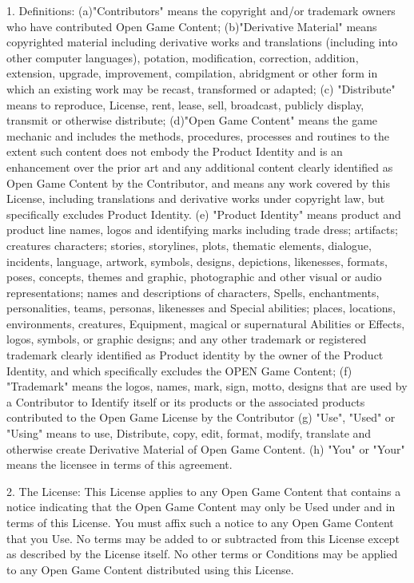 \documentclass[a4paper,11pt,twoside,openany]{book}
\begin{document}
{{1. Definitions: (a)"Contributors" means the copyright and/or trademark owners who have contributed Open Game Content; (b)"Derivative Material" means copyrighted material including derivative works and translations (including into other computer languages), potation, modification, correction, addition, extension, upgrade, improvement, compilation, abridgment or other form in which an existing work may be recast, transformed or adapted; (c) "Distribute" means to reproduce, License, rent, lease, sell, broadcast, publicly display, transmit or otherwise distribute; (d)"Open Game Content" means the game mechanic and includes the methods, procedures, processes and routines to the extent such content does not embody the Product Identity and is an enhancement over the prior art and any additional content clearly identified as Open Game Content by the Contributor, and means any work covered by this License, including translations and derivative works under copyright law, but specifically excludes Product Identity. (e) "Product Identity" means product and product line names, logos and identifying marks including trade dress; artifacts; creatures characters; stories, storylines, plots, thematic elements, dialogue, incidents, language, artwork, symbols, designs, depictions, likenesses, formats, poses, concepts, themes and graphic, photographic and other visual or audio representations; names and descriptions of characters, Spells, enchantments, personalities, teams, personas, likenesses and Special abilities; places, locations, environments, creatures, Equipment, magical or supernatural Abilities or Effects, logos, symbols, or graphic designs; and any other trademark or registered trademark clearly identified as Product identity by the owner of the Product Identity, and which specifically excludes the OPEN Game Content; (f) "Trademark" means the logos, names, mark, sign, motto, designs that are used by a Contributor to Identify itself or its products or the associated products contributed to the Open Game License by the Contributor (g) "Use", "Used" or "Using" means to use, Distribute, copy, edit, format, modify, translate and otherwise create Derivative Material of Open Game Content. (h) "You" or "Your" means the licensee in terms of this agreement.

2. The License: This License applies to any Open Game Content that contains a notice indicating that the Open Game Content may only be Used under and in terms of this License. You must affix such a notice to any Open Game Content that you Use. No terms may be added to or subtracted from this License except as described by the License itself. No other terms or Conditions may be applied to any Open Game Content distributed using this License.

}}
\end{document}
